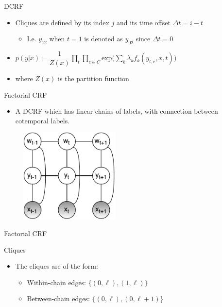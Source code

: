 \documentclass[presentation,bigger]{beamer}
\begin{document}
\begin{frame}[label={sec:orgheadline12}]{DCRF}
\begin{definition}
\begin{itemize}
\item Cliques are defined by its index \(j\) and its time offset \(\Delta t = i-t\)
\begin{itemize}
\item I.e. \(y_{12}\) when \(t = 1\) is denoted as \(y_{02}\) since \(\Delta t = 0\)
\end{itemize}
\item \(p(y|x) = \dfrac{1}{Z(x)}\displaystyle \prod_{t}\prod_{c \in C} \text{exp}\Bigg(\sum_k \lambda_k f_k(y_{t,c},x,t)\Bigg)\)
\item where \(Z(x)\) is the partition function
\end{itemize}
\end{definition}
\end{frame}
\begin{frame}[label={sec:orgheadline13}]{Factorial CRF}
\begin{itemize}
\item A DCRF which has linear chains of labels, with connection between cotemporal labels.
\end{itemize}
\begin{figure}[htb]
\centering
\includegraphics[width=5cm]{figures/FCRF.pdf}
\end{figure}
\end{frame}
\begin{frame}[label={sec:orgheadline14}]{Factorial CRF}
\begin{block}{Cliques}
\begin{itemize}
\item The cliques are of the form:
\begin{itemize}
\item Within-chain edges: \text{ }\text{ }\(\{(0,\ell),(1,\ell)\}\)
\item Between-chain edges: \(\{(0,\ell),(0,\ell+1)\}\)
\end{itemize}
\end{itemize}
\end{block}
\end{frame}
\end{document}
